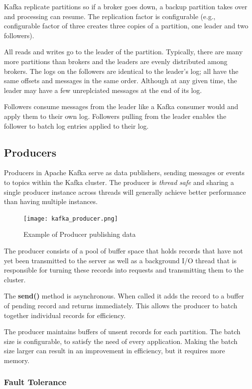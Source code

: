 Kafka replicate partitions so if a broker goes down, a backup partition takes
over and processing can resume. The replication factor is configurable
(e.g., configurable factor of three creates three copies of a partition, one
leader and two followers).

All reads and writes go to the leader of the partition. Typically, there are
many more partitions than brokers and the leaders are evenly distributed among
brokers. The logs on the followers are identical to the leader's log; all have
the same offsets and messages in the same order. Although at any given time,
the leader may have a few unreplciated messages at the end of its log.

Followers consume messages from the leader like a Kafka consumer would and
apply them to their own log. Followers pulling from the leader enables the
follower to batch log entries applied to their log.

\subsection{Producers}

Producers in Apache Kafka serve as data publishers, sending messages or events
to topics within the Kafka cluster.
The producer is \textit{thread safe} and sharing a single producer instance
across threads will generally achieve better performance than having multiple
instances.

\begin{figure}[ht]
    \centering
    \texttt{[image: kafka\_producer.png]}
    \caption{Example of Producer publishing data}
\end{figure}

The producer consists of a pool of buffer space that holds records that have not
yet been transmitted to the server as well as a background I/O thread that is
responsible for turning these records into requests and transmitting them to
the cluster.

The \textbf{send()} method is asynchronous. When called it adds the record to a
buffer of pending record and returns immediately. This allows the producer to
batch together individual records for efficiency.

The producer maintains buffers of unsent records for each partition. The batch
size is configurable, to satisfy the need of every application. Making the
batch size larger can result in an improvement in efficiency, but it requires
more memory.

\subsubsection{Fault Tolerance}

